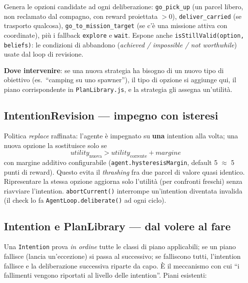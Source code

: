 \documentclass[11pt,a4paper]{article}
\newcommand{\file}[1]{\texttt{#1}}
\newcommand{\code}[1]{\texttt{#1}}
\begin{document}
Genera le opzioni candidate ad ogni deliberazione:
\code{go\_pick\_up} (un parcel libero, non reclamato dal compagno, con
reward proiettata $>0$), \code{deliver\_carried} (se trasporto qualcosa),
\code{go\_to\_mission\_target} (se c'è una missione attiva con coordinate),
più i fallback \code{explore} e \code{wait}. Espone anche
\code{isStillValid(option, beliefs)}: le condizioni di abbandono
(\emph{achieved / impossible / not worthwhile}) usate dal loop di revisione.

\textbf{Dove intervenire}: se una nuova strategia ha bisogno di un nuovo
tipo di obiettivo (es.\ ``camping su uno spawner''), il tipo di opzione si
aggiunge qui, il piano corrispondente in \file{PlanLibrary.js}, e la
strategia gli assegna un'utilità.

\subsection{IntentionRevision — impegno con isteresi}

Politica \emph{replace} raffinata: l'agente è impegnato su \textbf{una}
intention alla volta; una nuova opzione la sostituisce solo se
\[
  \mathit{utility}_{\text{nuova}} > \mathit{utility}_{\text{corrente}} + \mathit{margine}
\]
con margine additivo configurabile (\code{agent.hysteresisMargin}, default
5 $\approx$ 5 punti di reward). Questo evita il \emph{thrashing} fra due
parcel di valore quasi identico. Ripresentare la stessa opzione aggiorna
solo l'utilità (per confronti freschi) senza riavviare l'intention.
\code{abortCurrent()} interrompe un'intention diventata invalida (il check
lo fa \code{AgentLoop.deliberate()} ad ogni ciclo).

\subsection{Intention e PlanLibrary — dal volere al fare}

Una \code{Intention} prova \emph{in ordine} tutte le classi di piano
applicabili; se un piano fallisce (lancia un'eccezione) si passa al
successivo; se falliscono tutti, l'intention fallisce e la deliberazione
successiva riparte da capo. È il meccanismo con cui ``i fallimenti vengono
riportati al livello delle intention''. Piani esistenti:
\end{document}
